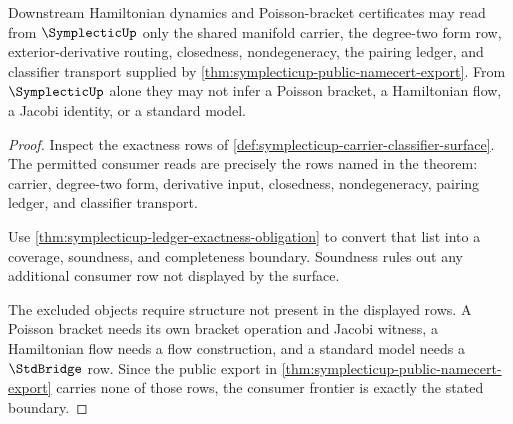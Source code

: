 \begin{theorem}
\label{thm:symplecticup-hamiltonian-poisson-consumer-frontier}
Downstream Hamiltonian dynamics and Poisson-bracket certificates may read from $\SymplecticUp$ only the shared manifold carrier, the degree-two form row, exterior-derivative routing, closedness, nondegeneracy, the pairing ledger, and classifier transport supplied by \autoref{thm:symplecticup-public-namecert-export}. From $\SymplecticUp$ alone they may not infer a Poisson bracket, a Hamiltonian flow, a Jacobi identity, or a standard model.
\end{theorem}
\begin{proof}
Inspect the exactness rows of \autoref{def:symplecticup-carrier-classifier-surface}. The permitted consumer reads are precisely the rows named in the theorem: carrier, degree-two form, derivative input, closedness, nondegeneracy, pairing ledger, and classifier transport.

Use \autoref{thm:symplecticup-ledger-exactness-obligation} to convert that list into a coverage, soundness, and completeness boundary. Soundness rules out any additional consumer row not displayed by the surface.

The excluded objects require structure not present in the displayed rows. A Poisson bracket needs its own bracket operation and Jacobi witness, a Hamiltonian flow needs a flow construction, and a standard model needs a $\StdBridge$ row. Since the public export in \autoref{thm:symplecticup-public-namecert-export} carries none of those rows, the consumer frontier is exactly the stated boundary.
\end{proof}

